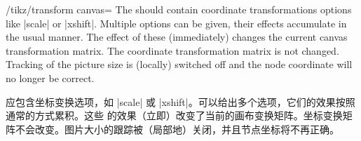 \begin{key}{/tikz/transform canvas=}
    The  should contain coordinate transformations options like
    |scale| or |xshift|. Multiple options can be given, their effects
    accumulate in the usual manner. The effect of these 
    (immediately) changes the current canvas transformation matrix. The
    coordinate transformation matrix is not changed. Tracking of the picture
    size is (locally) switched off and the node coordinate will no longer be
    correct.
    
     应包含坐标变换选项，如 |scale| 或 |xshift|。可以给出多个选项，它们的效果按照通常的方式累积。这些  的效果（立即）改变了当前的画布变换矩阵。坐标变换矩阵不会改变。图片大小的跟踪被（局部地）关闭，并且节点坐标将不再正确。
\begin{codeexample}[]
\end{codeexample}
\end{key}
